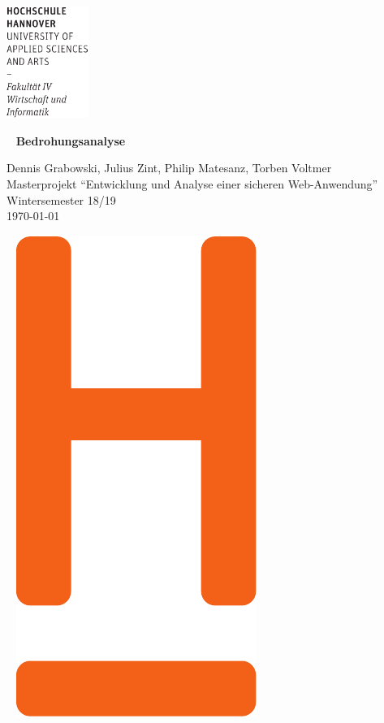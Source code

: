 \documentclass[12pt,DIV14,BCOR10mm,a4paper,twoside,parskip=half-,headsepline,headinclude,english,ngerman,bibliography=totocnumbered]{scrreprt}
\begin{document}
  \thispagestyle{empty} %
\includegraphics[width=0.2\textwidth]{Wortmarke_WI_schwarz}

   {  ~ \sffamily
  \vfill
  {\Huge\bfseries Bedrohungsanalyse}
  \bigskip

  {\Large
  Dennis Grabowski, Julius Zint, Philip Matesanz, Torben Voltmer \\[2ex]
  Masterprojekt \enquote{Entwicklung und Analyse einer sicheren Web-Anwendung} \\
  Wintersemester 18/19
 \\[5ex]
   \today }
}
 \vfill

  ~ \hfill
  \includegraphics[height=0.3\paperheight]{H_WI_Pantone1665}

\vspace*{-3cm}
\end{document}
